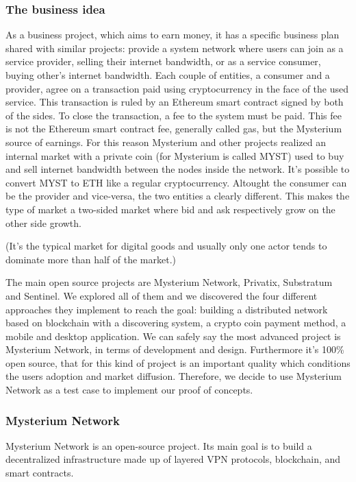 \documentclass[]{article}
\begin{document}
	\subsubsection{The business idea}
	As a business project, which aims to earn money, it has a specific business plan shared with similar projects: provide a system network where users can join as a service provider, selling their internet bandwidth, or as a service consumer, buying other's internet bandwidth. Each couple of entities, a consumer and a provider, agree on a transaction paid using cryptocurrency in the face of the used service. This transaction is ruled by an Ethereum smart contract signed by both of the sides. To close the transaction, a fee to the system must be paid. This fee is not the Ethereum smart contract fee, generally called gas, but the Mysterium source of earnings. For this reason Mysterium and other projects realized an internal market with a private coin (for Mysterium is called MYST) used to buy and sell internet bandwidth between the nodes inside the network. It's possible to convert MYST to ETH like a regular cryptocurrency.
	Altought the consumer can be the provider and vice-versa, the two entities a clearly different. This makes the type of market a two-sided market where bid and ask respectively grow on the other side growth. 
	
	(It's the typical market for digital goods and usually only one actor tends to dominate more than half of the market.)
	
	
	The main open source projects are Mysterium Network, Privatix, Substratum and Sentinel. We explored all of them and we discovered the four different approaches they implement to reach the goal: building a distributed network based on blockchain with a discovering system, a crypto coin payment method, a mobile and desktop application.
	We can safely say the most advanced project is Mysterium Network, in terms of development and design. Furthermore it's 100\% open source, that for this kind of project is an important quality which conditions the users adoption and market diffusion.
	Therefore, we decide to use Mysterium Network as a test case to implement our proof of concepts.
	
	\subsubsection{Mysterium Network}
	
	Mysterium Network is an open-source project. Its main goal is to build a decentralized infrastructure made up of layered VPN protocols, blockchain, and smart contracts.
\end{document}
